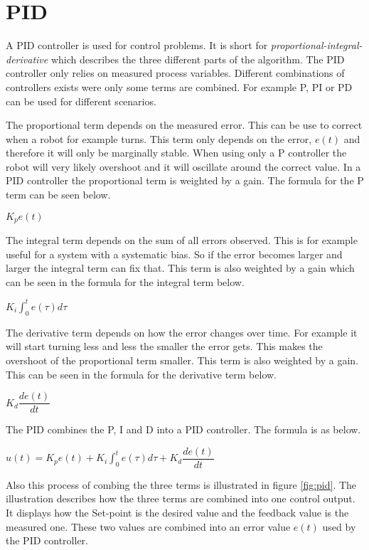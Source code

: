 \chapter{PID}
\label{chp:pid}
A PID controller is used for control problems. It is short for \emph{proportional-integral-derivative} which describes the three different parts of the algorithm. The PID controller only relies on measured process variables. Different combinations of controllers exists were only some terms are combined. For example P, PI or PD can be used for different scenarios. 

The proportional term depends on the measured error. This can be use to correct when a robot for example turns. This term only depends on the error, $e(t)$ and therefore it will only be marginally stable. When using only a P controller the robot will very likely overshoot and it will oscillate around the correct value. In a PID controller the proportional term is weighted by a gain. The formula for the P term can be seen below.
\begin{center}
	$K_p e(t)$
\end{center}

The integral term depends on the sum of all errors observed. This is for example useful for a system with a systematic bias. So if the error becomes larger and larger the integral term can fix that. This term is also weighted by a gain which can be seen in the formula for the integral term below.

\begin{center}
	$K_i \int_{0}^{t} e(\tau) d\tau$
\end{center}

The derivative term depends on how the error changes over time. For example it will start turning less and less the smaller the error gets. This makes the overshoot of the proportional term smaller. This term is also weighted by a gain. This can be seen in the formula for the derivative term below.

\begin{center}
	$K_d \dfrac{de(t)}{dt}$
\end{center}

The PID combines the P, I and D into a PID controller. The formula is as below.

\begin{center}
	$u(t) =  K_p e(t) + K_i \int_{0}^{t} e(\tau) d\tau + K_d \dfrac{de(t)}{dt}$
\end{center}

Also this process of combing the three terms is illustrated in figure \ref{fig:pid}. The illustration describes how the three terms are combined into one control output. It displays how the Set-point is the desired value and the feedback value is the measured one. These two values are combined into an error value $e(t)$ used by the PID controller.

